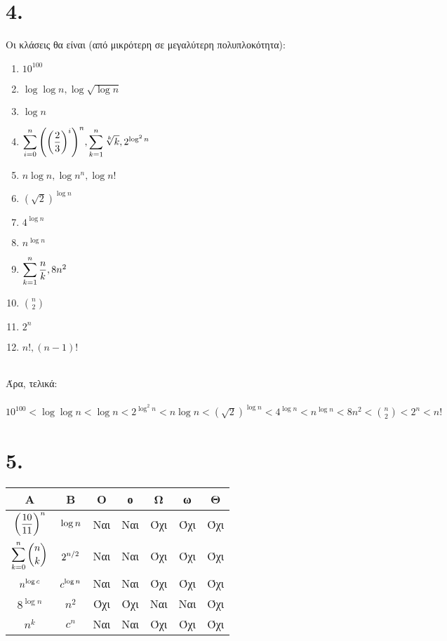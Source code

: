 \documentclass{article}
\begin{document}
\section*{4.}
Οι κλάσεις θα είναι (από μικρότερη σε μεγαλύτερη πολυπλοκότητα):
\begin{enumerate}
\item
$10^{100} $
\item
$\log{\log{n}} , \log{\sqrt{\log{n}}}$
\item
$\log{n}$
\item
$\mathlarger{\sum\limits_{i=0}^n \left(\left(\frac{2}{3}\right)^i\right)^n    },   \mathlarger{\sum\limits_{k=1}^n \sqrt[k]{k} }, 2^{\log^2{n}} $
\item
$ n\log{n},  \log{n^n}, \log{n!} $
\item
$ (\sqrt{2})^{\log{n}}$
\item
 $4^{\log{n}}$  
\item
 $n^{\log{n}} $
\item
$\mathlarger{\sum\limits_{k=1}^n \frac{n}{k}}, 8n^2  $
\item
$\binom{n}{2} $
\item
$2^n$
\item
$n!,  (n-1)! $ \\\\
\end{enumerate}
Άρα, τελικά:\\\\
$10^{100} <  \log{\log{n}} < \log{n} < 2^{\log^2{n}} <  n\log{n} <  (\sqrt{2})^{\log{n}} < 4^{\log{n}} < n^{\log{n}} < 8n^2 < \binom{n}{2} < 2^n < n!$

\section*{5.}
\renewcommand{\arraystretch}{2.5}
\begin{center}
\begin{tabular}{ c c|c|c|c|c|c| } 
 Α & Β & Ο & ο & Ω & ω & Θ \\
\hline 
 $\mathlarger{ \left( \frac{10}{11} \right)^n }$ & $\mathlarger{\log{n} }$ & Ναι & Ναι & Όχι & Όχι & Όχι\\
\hline 
 $\mathlarger{\sum\limits_{k=0}^n \binom{n}{k} }$ & $\mathlarger{2^{n/2} }$ & Ναι & Ναι & Όχι & Όχι & Όχι \\
\hline
$ \mathlarger{n^{\log{c}}} $ & $\mathlarger{c^{\log{n}}} $ & Ναι & Ναι & Όχι & Όχι & Όχι \\
 \hline
$ 8^{\log{n}} $ & $ n^2 $ & Όχι & Όχι & Ναι & Ναι & Όχι\\
\hline
$ n^k $ & $ c^n $ & Ναι & Ναι & Όχι & Όχι & Όχι\\
\hline
\end{tabular}
\end{center}
\end{document}
